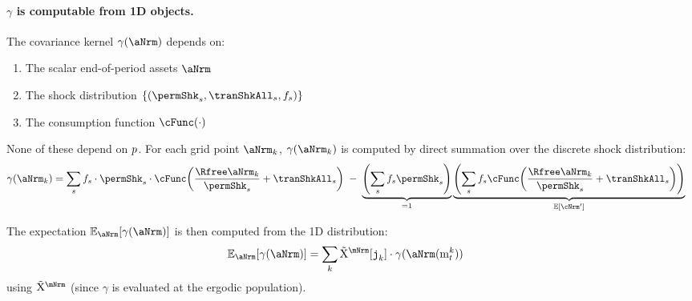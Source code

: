 \documentclass[\econtexRoot/BufferStockTheory]{subfiles}
\begin{document}
\paragraph{$\gamma$ is computable from 1D objects.}
The covariance kernel $\gamma(\aNrm)$ depends on:
\begin{enumerate}
\item The scalar end-of-period assets $\aNrm$
\item The shock distribution $\{(\permShk_{s}, \tranShkAll_{s}, f_{s})\}$
\item The consumption function $\cFunc(\cdot)$
\end{enumerate}
None of these depend on $p$. For each grid point $\aNrm_{k}$, $\gamma(\aNrm_{k})$ is computed by direct summation over the discrete shock distribution:
\begin{equation}\begin{gathered}\begin{aligned} \label{eq:GammaDiscrete}
\gamma(\aNrm_{k}) & = \sum_{s} f_{s} \cdot \permShk_{s} \cdot \cFunc\!\left(\frac{\Rfree \aNrm_{k}}{\PermGroFac \permShk_{s}} + \tranShkAll_{s}\right) \; - \; \underbrace{\left(\sum_{s} f_{s} \permShk_{s}\right)}_{=1} \underbrace{\left(\sum_{s} f_{s} \cFunc\!\left(\frac{\Rfree \aNrm_{k}}{\PermGroFac \permShk_{s}} + \tranShkAll_{s}\right)\right)}_{\mathbb{E}[\cNrm']}
\end{aligned}\end{gathered}\end{equation}

The expectation $\mathbb{E}_{\aNrm}[\gamma(\aNrm)]$ is then computed from the 1D distribution:
\begin{equation}\begin{gathered}\begin{aligned} \label{eq:EGammaTM}
\mathbb{E}_{\aNrm}[\gamma(\aNrm)] & = \sum_{k} \mpMatMargWgt[\nmNrmVecNow_{k}] \cdot \gamma(\aNrm(\mNrmVec_{t}^{k}))
\end{aligned}\end{gathered}\end{equation}
using $\mpMatMargWgt$ (since $\gamma$ is evaluated at the ergodic population).
\end{document}
